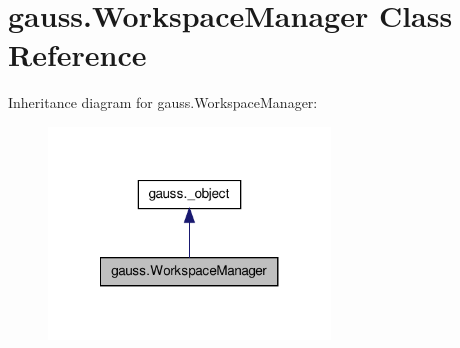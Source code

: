 \hypertarget{classgauss_1_1_workspace_manager}{\section{gauss.\-Workspace\-Manager Class Reference}
\label{classgauss_1_1_workspace_manager}
}


Inheritance diagram for gauss.\-Workspace\-Manager\-:\nopagebreak
\begin{figure}[H]
\begin{center}
\leavevmode
\includegraphics[width=212pt]{classgauss_1_1_workspace_manager__inherit__graph}
\end{center}
\end{figure}
